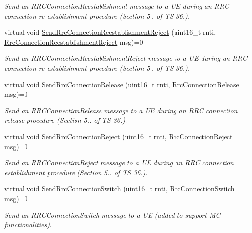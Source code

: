 \begin{DoxyCompactItemize}
\begin{DoxyCompactList}\small\item\em Send an {\itshape R\+R\+C\+Connection\+Reestablishment} message to a UE during an R\+RC connection re-\/establishment procedure (Section 5.. of TS 36.). \end{DoxyCompactList}\item 
virtual void \hyperlink{classns3_1_1LteEnbRrcSapUser_a0794b6b54c34ab842caaa53c95bf64d1}{Send\+Rrc\+Connection\+Reestablishment\+Reject} (uint16\+\_\+t rnti, \hyperlink{structns3_1_1LteRrcSap_1_1RrcConnectionReestablishmentReject}{Rrc\+Connection\+Reestablishment\+Reject} msg)=0
\begin{DoxyCompactList}\small\item\em Send an {\itshape R\+R\+C\+Connection\+Reestablishment\+Reject} message to a UE during an R\+RC connection re-\/establishment procedure (Section 5.. of TS 36.). \end{DoxyCompactList}\item 
virtual void \hyperlink{classns3_1_1LteEnbRrcSapUser_aec61c43238f60e0e47cd3e2654eb3d7e}{Send\+Rrc\+Connection\+Release} (uint16\+\_\+t rnti, \hyperlink{structns3_1_1LteRrcSap_1_1RrcConnectionRelease}{Rrc\+Connection\+Release} msg)=0
\begin{DoxyCompactList}\small\item\em Send an {\itshape R\+R\+C\+Connection\+Release} message to a UE during an R\+RC connection release procedure (Section 5.. of TS 36.). \end{DoxyCompactList}\item 
virtual void \hyperlink{classns3_1_1LteEnbRrcSapUser_ac722720a36e39c90f2e7980ab629410b}{Send\+Rrc\+Connection\+Reject} (uint16\+\_\+t rnti, \hyperlink{structns3_1_1LteRrcSap_1_1RrcConnectionReject}{Rrc\+Connection\+Reject} msg)=0
\begin{DoxyCompactList}\small\item\em Send an {\itshape R\+R\+C\+Connection\+Reject} message to a UE during an R\+RC connection establishment procedure (Section 5.. of TS 36.). \end{DoxyCompactList}\item 
virtual void \hyperlink{classns3_1_1LteEnbRrcSapUser_ac32b1b3e4ef10fcb32c1b2211704c1e7}{Send\+Rrc\+Connection\+Switch} (uint16\+\_\+t rnti, \hyperlink{structns3_1_1LteRrcSap_1_1RrcConnectionSwitch}{Rrc\+Connection\+Switch} msg)=0
\begin{DoxyCompactList}\small\item\em Send an {\itshape R\+R\+C\+Connection\+Switch} message to a UE (added to support MC functionalities). \end{DoxyCompactList}\item 

\end{DoxyCompactItemize}
